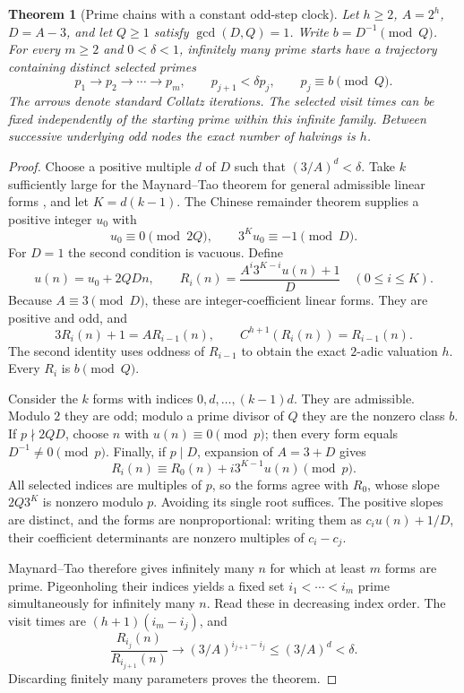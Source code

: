 \documentclass[11pt,a4paper]{article}
\newtheorem{theorem}{Theorem}[section]
\theoremstyle{definition}
\theoremstyle{remark}
\numberwithin{equation}{section}
\begin{document}
\begin{theorem}[Prime chains with a constant odd-step clock]
\label{A:thm:prime-chain-generalized}
Let $h\ge2$, $A=2^h$, $D=A-3$, and let $Q\ge1$ satisfy
$\gcd(D,Q)=1$. Write $b=D^{-1}\pmod Q$. For every $m\ge2$ and
$0<\delta<1$, infinitely many prime starts have a trajectory containing
distinct selected primes
\[
 p_1\longrightarrow p_2\longrightarrow\cdots\longrightarrow p_m,
 \qquad p_{j+1}<\delta p_j,\qquad p_j\equiv b\pmod Q.
\]
The arrows denote standard Collatz iterations. The selected visit times
can be fixed independently of the starting prime within this infinite
family. Between successive underlying odd nodes the exact number of
halvings is $h$.
\end{theorem}
\begin{proof}
Choose a positive multiple $d$ of $D$ such that $(3/A)^d<\delta$.
Take $k$ sufficiently large for the Maynard--Tao theorem for general
admissible linear forms \cite{R008,R007}, and let $K=d(k-1)$.
The Chinese remainder theorem supplies a positive integer $u_0$ with
\[
 u_0\equiv0\pmod{2Q},\qquad 3^K u_0\equiv-1\pmod D.
\]
For $D=1$ the second condition is vacuous. Define
\[
 u(n)=u_0+2QD n,\qquad
 R_i(n)=\frac{A^i3^{K-i}u(n)+1}{D}\quad(0\le i\le K).
\]
Because $A\equiv3\pmod D$, these are integer-coefficient linear forms.
They are positive and odd, and
\[
 3R_i(n)+1=A R_{i-1}(n),\qquad C^{h+1}(R_i(n))=R_{i-1}(n).
\]
The second identity uses oddness of $R_{i-1}$ to obtain the exact
$2$-adic valuation $h$. Every $R_i$ is $b\pmod Q$.

Consider the $k$ forms with indices $0,d,\ldots,(k-1)d$. They are
admissible. Modulo $2$ they are odd; modulo a prime divisor of $Q$ they
are the nonzero class $b$. If $p\nmid2QD$, choose $n$ with
$u(n)\equiv0\pmod p$; then every form equals $D^{-1}\ne0\pmod p$.
Finally, if $p\mid D$, expansion of $A=3+D$ gives
\[
 R_i(n)\equiv R_0(n)+i3^{K-1}u(n)\pmod p.
\]
All selected indices are multiples of $p$, so the forms agree with
$R_0$, whose slope $2Q3^K$ is nonzero modulo $p$. Avoiding its single
root suffices. The positive slopes are distinct, and the forms are
nonproportional: writing them as $c_i u(n)+1/D$, their coefficient
determinants are nonzero multiples of $c_i-c_j$.

Maynard--Tao therefore gives infinitely many $n$ for which at least
$m$ forms are prime. Pigeonholing their indices yields a fixed set
$i_1<\cdots<i_m$ prime simultaneously for infinitely many $n$.
Read these in decreasing index order. The visit times are
$(h+1)(i_m-i_j)$, and
\[
 \frac{R_{i_j}(n)}{R_{i_{j+1}}(n)}
 \longrightarrow(3/A)^{i_{j+1}-i_j}\le(3/A)^d<\delta.
\]
Discarding finitely many parameters proves the theorem.
\end{proof}
\end{document}

